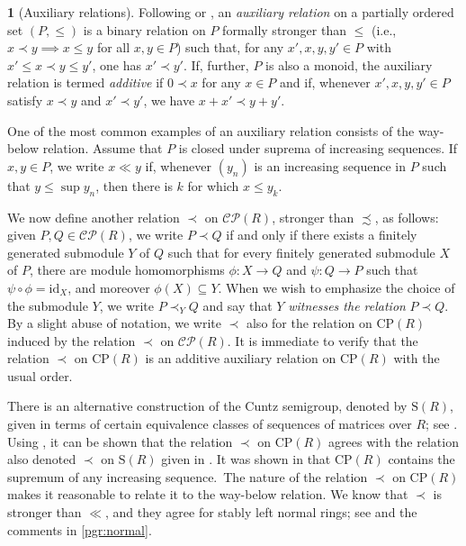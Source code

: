 \documentclass[11pt]{amsart}
\numberwithin{equation}{section}
\theoremstyle{definition}
\newtheorem{pgr}[pgrCt]{}
\newcommand{\CP}{\mathrm{CP}}
\theoremstyle{plain}
\theoremstyle{definition}
\begin{document}
\begin{pgr}[Auxiliary relations]
Following \cite[Definition I-1.11]{GieHof+03Domains} or \cite[2.1.1]{AntPerThi14arX:TensorProdCu}, an \emph{auxiliary relation} on a partially ordered set $(P, \leq)$ is a binary relation on $P$ formally stronger than $\leq$ (i.e., $x \prec y \implies x \leq y$ for all $x, y \in P$) such that, for any $x',x,y,y' \in P$ with $x' \leq x \prec y \leq y'$, one has $x' \prec y'$. If, further, $P$ is also a monoid, the auxiliary relation is termed \emph{additive} if $0 \prec x$ for any $x \in P$ and if, whenever $x',x,y,y' \in P$ satisfy $x \prec y$ and $x' \prec y'$, we have $x + x' \prec y + y'$.

One of the most common examples of an auxiliary relation consists of the way-below relation. Assume that $P$ is closed under suprema of increasing sequences. If $x,y\in P$, we write $x\ll y$ if, whenever $(y_n)$ is an increasing sequence in $P$ such that $y\leq \sup y_n$, then there is $k$ for which $x\leq y_k$.  

We now define another relation $\prec$ on $\mathcal{CP}(R)$, stronger than $\precsim$, as follows: given $P, Q \in \mathcal{CP}(R)$, we write $P \prec Q$ if and only if there exists a finitely generated submodule $Y$ of $Q$ such that for every finitely generated submodule $X$ of $P$, there are module homomorphisms $\phi\colon X \rightarrow Q$ and $\psi \colon Q \rightarrow P$ such that $\psi \circ \phi = \mathrm{id}_X$, and moreover $\phi(X) \subseteq Y$. When we wish to emphasize the choice of the submodule $Y$, we write $P \prec_Y Q$ and say that $Y$ \emph{witnesses the relation} $P \prec Q$. By a slight abuse of notation, we write $\prec$ also for the relation on $\mathrm{CP}(R)$ induced by the relation $\prec$ on $\mathcal{CP}(R)$. It is immediate to verify that the relation $\prec$ on $\mathrm{CP}(R)$ is an additive auxiliary relation on $\mathrm{CP}(R)$ with the usual order.   

There is an alternative construction of the Cuntz semigroup, denoted by $\mathrm{S}(R)$, given in terms of certain equivalence classes of sequences of matrices over $R$; see \cite[4.1]{AntAraBosPerVil25}. Using \cite[Theorem 4.10]{AntAraBosPerVil25}, it can be shown that the relation $\prec$ on $\CP(R)$ agrees with the relation also denoted $\prec$ on $\mathrm{S}(R)$ given in \cite[Remark 6.4]{AntAraBosPerVil25}. It was shown in \cite[Lemma 4.3]{AntAraBosPerVil25} that $\CP(R)$ contains the supremum of any increasing sequence.~The nature of the relation $\prec$ on $\CP(R)$ makes it reasonable to relate it to the way-below relation. We know that $\prec$ is stronger than $\ll$, and they agree for stably left normal rings; see \cite[Theorem 7.8]{AntAraBosPerVil26} and the comments in \autoref{pgr:normal}.
\end{pgr}
\end{document}
